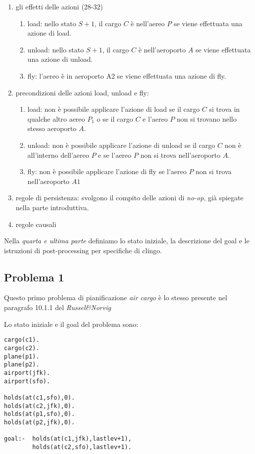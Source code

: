 \begin{enumerate}
\item gli effetti delle azioni (28-32)
\begin{enumerate}
\item load: nello stato $S+1$, il cargo $C$ è nell'aereo $P$ se viene effettuata una azione di load.
\item unload: nello stato $S+1$, il cargo $C$ è nell'aeroporto $A$ se viene effettuata una azione di unload.
\item fly: l'aereo è in aeroporto A2 se viene effettuata una azione di fly.
\end{enumerate}

\item precondizioni delle azioni load, unload e fly:
\begin{enumerate}
\item load: non è possibile applicare l'azione di load se il cargo $C$ si trova in qualche altro aereo $P_1$ o se il cargo $C$ e l'aereo $P$ non si trovano nello stesso aeroporto $A$.
\item unload: non è possibile applicare l'azione di unload se il cargo $C$ non è all'interno dell'aereo $P$ e se l'aereo $P$ non si trova nell'aeroporto $A$.
\item fly: non è possibile applicare l'azione di fly se l'aereo $P$ non si trova nell'aeroporto $A1$
\end{enumerate}

\item regole di persistenza: svolgono il compito delle azioni di \emph{no-op}, già spiegate nella parte introduttiva.

\item regole causali

\end{enumerate}

Nella \emph{quarta e ultima parte} definiamo lo stato iniziale, la descrizione del goal e le istruzioni di post-processing per specifiche di clingo.

\subsection{Problema 1}

Questo primo problema di pianificazione \emph{air cargo} è lo stesso presente nel paragrafo 10.1.1 del \emph{Russel\&Norvig}

Lo stato iniziale e il goal del problema sono:

\begin{lstlisting}
cargo(c1).
cargo(c2).
plane(p1).
plane(p2).
airport(jfk).
airport(sfo).

holds(at(c1,sfo),0).
holds(at(c2,jfk),0).
holds(at(p1,sfo),0).
holds(at(p2,jfk),0).

goal:-  holds(at(c1,jfk),lastlev+1),
        holds(at(c2,sfo),lastlev+1).

\end{lstlisting}

